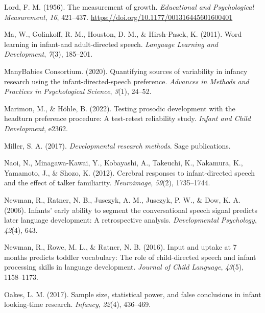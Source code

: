 \documentclass[
  man,floatsintext]{apa6}
\newlength{\cslhangindent}
\newlength{\cslentryspacingunit} %
\newenvironment{CSLReferences}[2] %
 {%
  \setlength{\parindent}{0pt}
  \ifodd #1
  \let\oldpar\par
  \def\par{\hangindent=\cslhangindent\oldpar}
  \fi
  \setlength{\parskip}{#2\cslentryspacingunit}
 }%
 {}
\begin{document}
\begin{CSLReferences}{1}{0}
\leavevmode{}%
Lord, F. M. (1956). The measurement of growth. \emph{Educational and Psychological Measurement}, \emph{16}, 421--437. \url{https://doi.org/10.1177/001316445601600401}

\leavevmode{}%
Ma, W., Golinkoff, R. M., Houston, D. M., \& Hirsh-Pasek, K. (2011). Word learning in infant-and adult-directed speech. \emph{Language Learning and Development}, \emph{7}(3), 185--201.

\leavevmode{}%
ManyBabies Consortium. (2020). Quantifying sources of variability in infancy research using the infant-directed-speech preference. \emph{Advances in Methods and Practices in Psychological Science}, \emph{3}(1), 24--52.

\leavevmode{}%
Marimon, M., \& Höhle, B. (2022). Testing prosodic development with the headturn preference procedure: A test-retest reliability study. \emph{Infant and Child Development}, e2362.

\leavevmode{}%
Miller, S. A. (2017). \emph{Developmental research methods}. Sage publications.

\leavevmode{}%
Naoi, N., Minagawa-Kawai, Y., Kobayashi, A., Takeuchi, K., Nakamura, K., Yamamoto, J., \& Shozo, K. (2012). Cerebral responses to infant-directed speech and the effect of talker familiarity. \emph{Neuroimage}, \emph{59}(2), 1735--1744.

\leavevmode{}%
Newman, R., Ratner, N. B., Jusczyk, A. M., Jusczyk, P. W., \& Dow, K. A. (2006). Infants' early ability to segment the conversational speech signal predicts later language development: A retrospective analysis. \emph{Developmental Psychology}, \emph{42}(4), 643.

\leavevmode{}%
Newman, R., Rowe, M. L., \& Ratner, N. B. (2016). Input and uptake at 7 months predicts toddler vocabulary: The role of child-directed speech and infant processing skills in language development. \emph{Journal of Child Language}, \emph{43}(5), 1158--1173.

\leavevmode{}%
Oakes, L. M. (2017). Sample size, statistical power, and false conclusions in infant looking-time research. \emph{Infancy}, \emph{22}(4), 436--469.


\end{CSLReferences}
\end{document}
